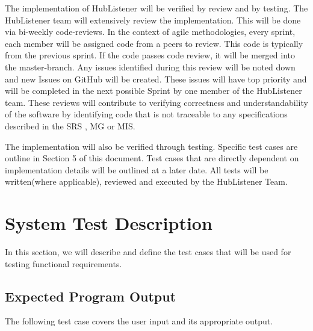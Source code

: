 \documentclass[12pt, titlepage]{article}
\begin{document}
The implementation of HubListener will be verified by review and by testing. The HubListener team will extensively review the implementation. This will be done via bi-weekly code-reviews. In the context of agile methodologies, every sprint, each member will be assigned code from a peers to review. This code is typically from the previous sprint. If the code passes code review, it will be merged into the master-branch. Any issues identified during this review will be noted down and new Issues on GitHub will be created. These issues will have top priority and will be completed in the next possible Sprint by one member of the HubListener team. These reviews will contribute to verifying correctness and understandability of the software by identifying code that is not traceable to any specifications described in the SRS , MG or MIS.
\newline

The implementation will also be verified through testing. Specific test cases are outline in Section 5 of this document. Test cases that are directly dependent on implementation details will be outlined at a later date. All tests will be written(where applicable), reviewed and executed by the HubListener Team. 

\section{System Test Description}
In this section, we will describe and define the test cases that will be used for testing functional requirements. 

\subsection{Expected Program Output}
The following test case covers the user input and its appropriate output. 
\end{document}
